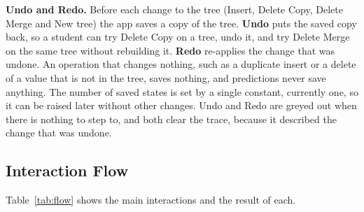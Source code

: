 \textbf{Undo and Redo.} Before each change to the tree (Insert, Delete Copy, Delete Merge and New tree) the app saves a copy of the tree. \textbf{Undo} puts the saved copy back, so a student can try Delete Copy on a tree, undo it, and try Delete Merge on the same tree without rebuilding it. \textbf{Redo} re-applies the change that was undone. An operation that changes nothing, such as a duplicate insert or a delete of a value that is not in the tree, saves nothing, and predictions never save anything. The number of saved states is set by a single constant, currently one, so it can be raised later without other changes. Undo and Redo are greyed out when there is nothing to step to, and both clear the trace, because it described the change that was undone.

\subsection{Interaction Flow}
Table~\ref{tab:flow} shows the main interactions and the result of each.

